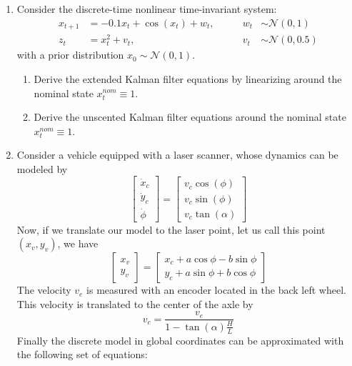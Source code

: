 \documentclass{article}
\begin{document}
\begin{enumerate}
  \item  Consider the discrete-time nonlinear time-invariant system:
  \begin{align*}
  x_{t+1} &= -0.1 x_t + \cos(x_t) + w_t, \qquad &w_t& \sim \mathcal{N}(0,1)\\
   z_t &= x_t^2 + v_t, \qquad &v_t& \sim \mathcal{N}(0,0.5)
  \end{align*}
  with a prior distribution $x_0 \sim \mathcal{N}(0,1)$.
    \begin{enumerate}
      \item Derive the extended Kalman filter equations by linearizing around the nominal state $x_t^{nom} \equiv 1$.
      \item Derive the unscented Kalman filter equations around the nominal state $x_t^{nom} \equiv 1$.
          \end{enumerate} 
\item Consider a vehicle equipped with a laser scanner, whose dynamics can be modeled by 
\begin{equation}
  \begin{bmatrix}
  \dot{x}_c \\ \dot{y}_c \\ \dot{\phi} 
  \end{bmatrix}
  =
   \begin{bmatrix}
  v_c \cos(\phi) \\ v_c \sin(\phi) \\ v_c \tan(\alpha) 
  \end{bmatrix}
\end{equation}
Now, if we translate our model to the laser point, let us call this point $(x_v,y_v)$,
we have
\begin{equation}
     \begin{bmatrix}
x_v \\ y_v
  \end{bmatrix}
  =
  \begin{bmatrix}
x_c + a \cos \phi - b \sin \phi \\
y_c + a \sin \phi + b \cos \phi 
  \end{bmatrix}
\end{equation}
The velocity $v_e$ is measured with an encoder located in the back left wheel.
This velocity is translated to the center of the axle by
\begin{equation}
v_c = \dfrac{v_e}{1-\tan(\alpha) \frac{H}{L} }    
\end{equation}
Finally the discrete model in global coordinates can be approximated with the following set of equations:

\end{enumerate}
\end{document}
